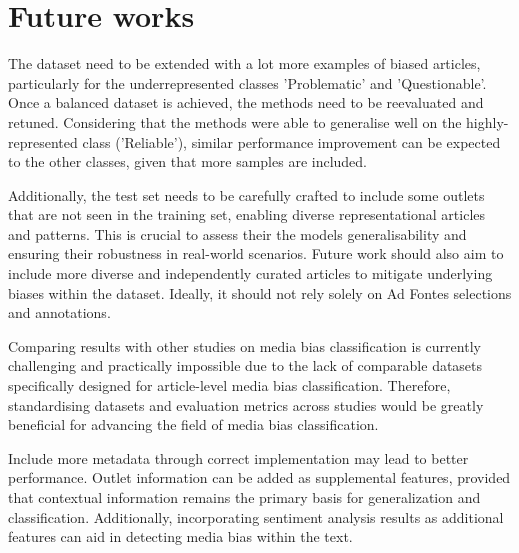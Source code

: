 
\section{Future works}



The dataset need to be extended with a lot more examples of biased articles, particularly for the underrepresented classes 'Problematic' and 'Questionable'. Once a balanced dataset is achieved, the methods need to be reevaluated and retuned. Considering that the methods were able to generalise well on the highly-represented class ('Reliable'), similar performance improvement can be expected to the other classes, given that more samples are included.

Additionally, the test set needs to be carefully crafted to include some outlets that are not seen in the training set, enabling diverse representational articles and patterns. This is crucial to assess their the models generalisability and ensuring their robustness in real-world scenarios. Future work should also aim to include more diverse and independently curated articles to mitigate underlying biases within the dataset. Ideally, it should not rely solely on Ad Fontes selections and annotations.

Comparing results with other studies on media bias classification is currently challenging and practically impossible due to the lack of comparable datasets specifically designed for article-level media bias classification. Therefore, standardising datasets and evaluation metrics across studies would be greatly beneficial for advancing the field of media bias classification.

Include more metadata through correct implementation may lead to better performance. Outlet information can be added as supplemental features, provided that contextual information remains the primary basis for generalization and classification. Additionally, incorporating sentiment analysis results as additional features can aid in detecting media bias within the text.

